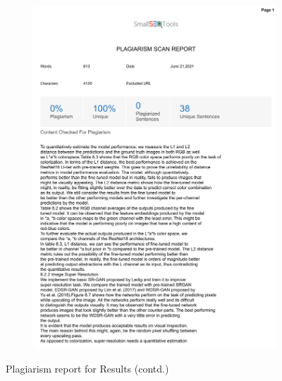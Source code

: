 \documentclass[oneside,a4paper,12pt]{report}
\begin{document}
\begin{appendices}
\begin{figure}
\begin{subfigure}[H]{\textwidth}
    	\includegraphics[scale=0.7, page=2]{plagiarism/results_2.pdf}
    \end{subfigure}
    \caption{Plagiarism report for Results (contd.)}
    \label{PlagiarismResults_3}
\end{figure}


\end{appendices}
\end{document}
